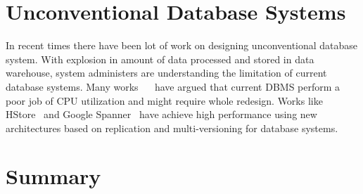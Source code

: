 \documentclass[12pt,english]{report}
\begin{document}
\section{Unconventional Database Systems}
In recent times there have been lot of work on designing unconventional database system. With explosion in amount of data processed and stored in data warehouse, system administers are understanding the limitation of current database systems. Many works ~\cite{Stonebraker:2007:EAE:1325851.1325981}~\cite{harizopoulos2008oltp} have argued that current DBMS perform a poor job of CPU utilization and might require whole redesign. Works like HStore~\cite{HSTORE:kallman2008h} and Google Spanner~\cite{corbett2012spanner} have achieve high performance using new architectures based on replication and multi-versioning for database systems. 

\section{Summary}
\end{document}
